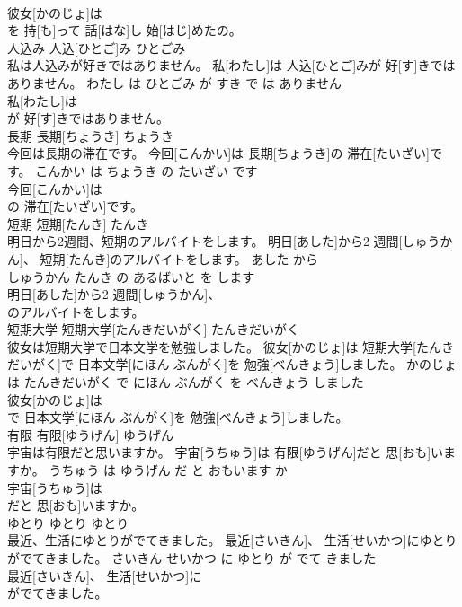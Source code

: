 \documentclass[8pt]{extreport}
\begin{document}
\begin{CJK}{UTF8}{min}
\\	彼女[かのじょ]は
\\	を 持[も]って 話[はな]し 始[はじ]めたの。			
\\	人込み	人込[ひとご]み	ひとごみ	
\\	私は人込みが好きではありません。	私[わたし]は 人込[ひとご]みが 好[す]きではありません。	わたし は ひとごみ が すき で は ありません	
\\	私[わたし]は
\\	が 好[す]きではありません。			
\\	長期	長期[ちょうき]	ちょうき	
\\	今回は長期の滞在です。	今回[こんかい]は 長期[ちょうき]の 滞在[たいざい]です。	こんかい は ちょうき の たいざい です	
\\	今回[こんかい]は
\\	の 滞在[たいざい]です。			
\\	短期	短期[たんき]	たんき	
\\	明日から2週間、短期のアルバイトをします。	明日[あした]から2 週間[しゅうかん]、 短期[たんき]のアルバイトをします。	あした から 
\\	しゅうかん たんき の あるばいと を します	
\\	明日[あした]から2 週間[しゅうかん]、
\\	のアルバイトをします。			
\\	短期大学	短期大学[たんきだいがく]	たんきだいがく	
\\	彼女は短期大学で日本文学を勉強しました。	彼女[かのじょ]は 短期大学[たんきだいがく]で 日本文学[にほん ぶんがく]を 勉強[べんきょう]しました。	かのじょ は たんきだいがく で にほん ぶんがく を べんきょう しました	
\\	彼女[かのじょ]は
\\	で 日本文学[にほん ぶんがく]を 勉強[べんきょう]しました。			
\\	有限	有限[ゆうげん]	ゆうげん	
\\	宇宙は有限だと思いますか。	宇宙[うちゅう]は 有限[ゆうげん]だと 思[おも]いますか。	うちゅう は ゆうげん だ と おもいます か	
\\	宇宙[うちゅう]は
\\	だと 思[おも]いますか。			
\\	ゆとり	ゆとり	ゆとり	
\\	最近、生活にゆとりがでてきました。	最近[さいきん]、 生活[せいかつ]にゆとりがでてきました。	さいきん せいかつ に ゆとり が でて きました	
\\	最近[さいきん]、 生活[せいかつ]に
\\	がでてきました。			

\end{CJK}
\end{document}
